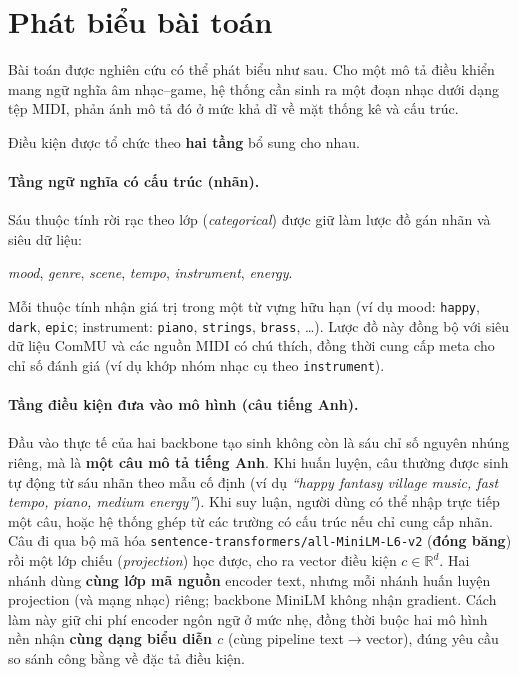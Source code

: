 \section{Phát biểu bài toán}
\label{sec:ch1-problem}

Bài toán được nghiên cứu có thể phát biểu như sau. Cho một mô tả điều khiển mang ngữ nghĩa âm nhạc--game, hệ thống cần sinh ra một đoạn nhạc dưới dạng tệp MIDI, phản ánh mô tả đó ở mức khả dĩ về mặt thống kê và cấu trúc.

Điều kiện được tổ chức theo \textbf{hai tầng} bổ sung cho nhau.

\paragraph{Tầng ngữ nghĩa có cấu trúc (nhãn).}
Sáu thuộc tính rời rạc theo lớp (\textit{categorical}) được giữ làm lược đồ gán nhãn và siêu dữ liệu:

\begin{center}
\textit{mood}, \textit{genre}, \textit{scene}, \textit{tempo}, \textit{instrument}, \textit{energy}.
\end{center}

Mỗi thuộc tính nhận giá trị trong một từ vựng hữu hạn (ví dụ mood: \texttt{happy}, \texttt{dark}, \texttt{epic}; instrument: \texttt{piano}, \texttt{strings}, \texttt{brass}, \ldots). Lược đồ này đồng bộ với siêu dữ liệu ComMU và các nguồn MIDI có chú thích, đồng thời cung cấp meta cho chỉ số đánh giá (ví dụ khớp nhóm nhạc cụ theo \texttt{instrument}).

\paragraph{Tầng điều kiện đưa vào mô hình (câu tiếng Anh).}
Đầu vào thực tế của hai backbone tạo sinh không còn là sáu chỉ số nguyên nhúng riêng, mà là \textbf{một câu mô tả tiếng Anh}. Khi huấn luyện, câu thường được sinh tự động từ sáu nhãn theo mẫu cố định (ví dụ \textit{``happy fantasy village music, fast tempo, piano, medium energy''}). Khi suy luận, người dùng có thể nhập trực tiếp một câu, hoặc hệ thống ghép từ các trường có cấu trúc nếu chỉ cung cấp nhãn. Câu đi qua bộ mã hóa \texttt{sentence-transformers/all-MiniLM-L6-v2} (\textbf{đóng băng}) rồi một lớp chiếu (\textit{projection}) học được, cho ra vector điều kiện $c\in\mathbb{R}^{d}$. Hai nhánh dùng \textbf{cùng lớp mã nguồn} encoder text, nhưng mỗi nhánh huấn luyện projection (và mạng nhạc) riêng; backbone MiniLM không nhận gradient. Cách làm này giữ chi phí encoder ngôn ngữ ở mức nhẹ, đồng thời buộc hai mô hình nền nhận \textbf{cùng dạng biểu diễn $c$} (cùng pipeline text$\rightarrow$vector), đúng yêu cầu so sánh công bằng về đặc tả điều kiện.

